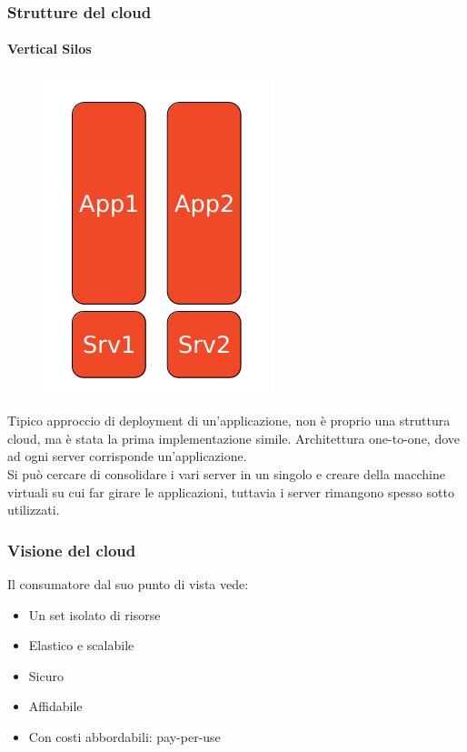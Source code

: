 \documentclass{article}
\begin{document}
		\subsubsection{Strutture del cloud}
		\paragraph{Vertical Silos}
		\begin{figure}
			\centering
			\includegraphics[width=0.6\linewidth]{SAC_A2_verticalsilos}
			\label{fig:saca2verticalsilos}
		\end{figure}
		
		Tipico approccio di deployment di un'applicazione, non è proprio una struttura cloud, ma è stata la prima implementazione simile.
		Architettura one-to-one, dove ad ogni server corrisponde un'applicazione.\\
		Si può cercare di consolidare i vari server in un singolo e creare della macchine virtuali su cui far girare le applicazioni, tuttavia i server rimangono spesso sotto utilizzati.
		
		\subsubsection{Visione del cloud}
		Il consumatore dal suo punto di vista vede:
		\begin{itemize}
		    \item Un set isolato di risorse
		    \item Elastico e scalabile
		    \item Sicuro
		    \item Affidabile
		    \item Con costi abbordabili: pay-per-use
		\end{itemize}
		
\end{document}
